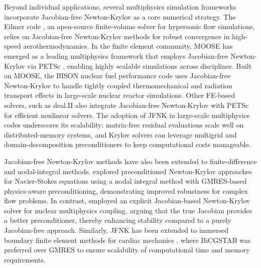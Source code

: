 \documentclass[sn-mathphys,Numbered]{sn-jnl}%
\begin{document}
Beyond individual applications, several multiphysics simulation frameworks incorporate Jacobian-free Newton-Krylov as a core numerical strategy.
The Eilmer code \citep{Eilmer2023}, an open-source finite-volume solver for hypersonic flow simulations, relies on Jacobian-free Newton-Krylov methods for robust convergence in high-speed aerothermodynamics.
In the finite element community, MOOSE \citep{Giudicelli2024, Zhu2025, Wu2024} has emerged as a leading multiphysics framework that employs Jacobian-free Newton-Krylov via PETSc \citep{PETSc}, enabling highly scalable simulations across disciplines.
Built on MOOSE, the BISON nuclear fuel performance code \citep{Williamson2021} uses Jacobian-free Newton-Krylov to handle tightly coupled thermomechanical and radiation transport effects in large-scale nuclear reactor simulations.
Other FE-based solvers, such as deal.II \citep{Africa2024, Munch2024} also integrate Jacobian-free Newton-Krylov with PETSc \citep{PETSc} for efficient nonlinear solvers.
The adoption of JFNK in large-scale multiphysics codes underscores its scalability: matrix-free residual evaluations scale well on distributed-memory systems, and Krylov solvers can leverage multigrid and domain-decomposition preconditioners to keep computational costs manageable.

Jacobian-free Newton-Krylov methods have also been extended to finite-difference and nodal-integral methods.
\citet{Ahmed2025} explored preconditioned Newton-Krylov approaches for Navier-Stokes equations using a nodal integral method with GMRES-based physics-aware preconditioning, demonstrating improved robustness for complex flow problems.
In contrast, \citet{Liu2025} employed an explicit Jacobian-based Newton-Krylov solver for nuclear multiphysics coupling, arguing that the true Jacobian provides a better preconditioner, thereby enhancing stability compared to a purely Jacobian-free approach.
Similarly, JFNK has been extended to immersed boundary finite element methods for cardiac mechanics \citep{Ma2024}, where BiCGSTAB was preferred over GMRES to ensure scalability of computational time and memory requirements.
\end{document}

